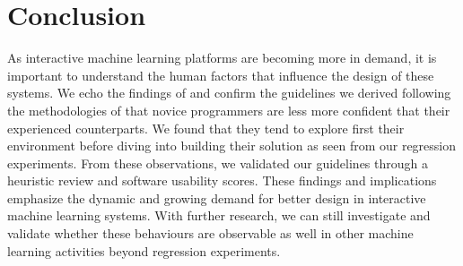 \documentclass{sigchi}
\begin{document}
\section{Conclusion}
As interactive machine learning platforms are becoming more in demand, it is important to understand the human factors that influence the design of these systems. We echo the findings of \cite{sarkar2015interactive} and confirm the guidelines we derived following the methodologies of \cite{amershi2011designing} that novice programmers are less more confident that their experienced counterparts. We found that they tend to explore first their environment before diving into building their solution as seen from our regression experiments. From these observations, we validated our guidelines through a heuristic review and software usability scores. These findings and implications emphasize the dynamic and growing demand for better design in interactive machine learning systems. With further research, we can still investigate and validate whether these behaviours are observable as well in other machine learning activities beyond regression experiments. 





%
\balance{}


\balance{}



\end{document}

